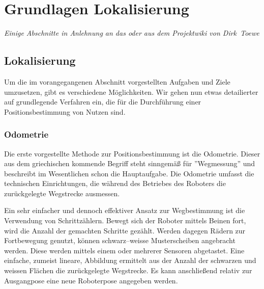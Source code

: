 \section{Grundlagen Lokalisierung}
\label{lokalisierung_grundlagen_sec}
\authorsection{\editoranne}
\begin{flushright}\textit{Einige Abschnitte in Anlehnung an das oder aus dem Projektwiki von Dirk~Toewe}\end{flushright}
\subsection{Lokalisierung}
Um die im vorangegangenen Abschnitt vorgestellten Aufgaben und Ziele umzusetzen, gibt es verschiedene Möglichkeiten. Wir gehen nun etwas detailierter auf grundlegende Verfahren ein, die für die Durchführung einer Positionsbestimmung von Nutzen sind.
 
\subsubsection{Odometrie}
Die erste vorgestellte Methode zur Positionsbestimmung ist die Odometrie. Dieser aus dem griechischen kommende Begriff steht sinngemäß für ''Wegmessung'' und beschreibt im Wesentlichen schon die Hauptaufgabe. Die Odometrie umfasst die technischen Einrichtungen, die während des Betriebes des Roboters die zurückgelegte Wegstrecke ausmessen.

Ein sehr einfacher und dennoch effektiver Ansatz zur Wegbestimmung ist die Verwendung von Schrittzählern. Bewegt sich der Roboter mittels Beinen fort, wird die Anzahl der gemachten Schritte gezählt. Werden dagegen Rädern  zur Fortbewegung genutzt, können schwarz--weisse Musterscheiben angebracht werden. Diese werden mittels einem oder mehrerer Sensoren abgetastet. Eine einfache, zumeist lineare, Abbildung ermittelt aus der Anzahl der schwarzen und weissen Flächen die zurückgelegte Wegstrecke. Es kann anschließend relativ zur Ausgangpose eine neue Roboterpose angegeben werden.

